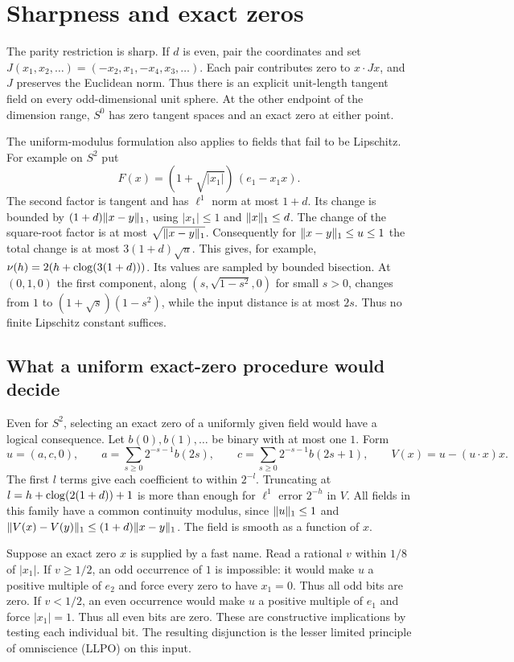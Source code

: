 \section{Sharpness and exact zeros}\label{sec:sharpness}
The parity restriction is sharp. If $d$ is even, pair the coordinates and
set $J(x_1,x_2,\ldots)=(-x_2,x_1,-x_4,x_3,\ldots)$. Each pair
contributes zero to $x\cdot Jx$, and $J$ preserves the Euclidean norm.
Thus there is an explicit unit-length tangent field on every
odd-dimensional unit sphere. At the other endpoint of the dimension
range, $S^0$ has zero tangent spaces and an exact zero at either point.

The uniform-modulus formulation also applies to fields that fail to be
Lipschitz. For example on $S^2$ put
\[
       F(x)=(1+\sqrt{|x_1|})\,(e_1-x_1 x).
\]
The second factor is tangent and has $\ell^1$ norm at most $1+d$.
Its change is bounded by $(1+d)\lVert x-y\rVert_1$, using $|x_1|\le1$ and
$\lVert x\rVert_1\le d$. The change of the square-root factor is at most
$\sqrt{\lVert x-y\rVert_1}$. Consequently for $\lVert x-y\rVert_1\le u\le1$ the total
change is at most $3(1+d)\sqrt{u}$. This gives, for example,
$\nu(h)=2(h+\operatorname{clog}(3(1+d)))$. Its values are sampled by bounded bisection.
At $(0,1,0)$ the first component, along
$(s,\sqrt{1-s^2},0)$ for small $s>0$, changes from $1$ to
$(1+\sqrt{s})(1-s^2)$, while the input distance is at most $2s$.
Thus no finite Lipschitz constant suffices.

\subsection{What a uniform exact-zero procedure would decide}
Even for $S^2$, selecting an exact zero of a uniformly given field
would have a logical consequence. Let $b(0),b(1),\ldots$ be binary
with at most one $1$. Form
\[
 u=(a,c,0),\qquad a=\sum_{s\ge0}2^{-s-1}b(2s),\qquad
 c=\sum_{s\ge0}2^{-s-1}b(2s+1),
 \qquad V(x)=u-(u\cdot x)x .
\]
The first $l$ terms give each coefficient to within $2^{-l}$.
Truncating at $l=h+\operatorname{clog}(2(1+d))+1$ is more than enough for
$\ell^1$ error $2^{-h}$ in $V$. All fields in this family have a
common continuity modulus, since $\lVert u\rVert_1\le1$ and
$\lVert V(x)-V(y)\rVert_1\le(1+d)\lVert x-y\rVert_1$. The field is smooth as a
function of $x$.

Suppose an exact zero $x$ is supplied by a fast name. Read a rational
$v$ within $1/8$ of $|x_1|$. If $v\ge1/2$, an odd occurrence of $1$
is impossible: it would make $u$ a positive multiple of $e_2$ and
force every zero to have $x_1=0$. Thus all odd bits are zero.
If $v<1/2$, an even occurrence would make $u$ a positive multiple
of $e_1$ and force $|x_1|=1$. Thus all even bits are zero. These are
constructive implications by testing each individual bit.
The resulting disjunction is the lesser limited principle of
omniscience (LLPO) on this input.

